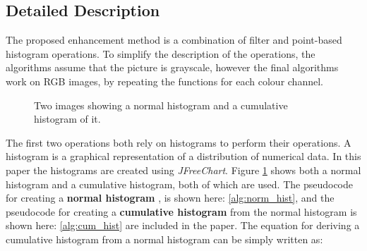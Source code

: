 \documentclass[journal,transmag]{IEEEtran}
\begin{document}
\subsection{Detailed Description}
The proposed enhancement method is a combination of filter and point-based histogram operations. To simplify the description of the operations, the algorithms assume that the picture is grayscale, however the final algorithms work on RGB images, by repeating the functions for each colour channel. 
\begin{figure}[h!] %
	\centering
	\caption{Two images showing a normal histogram and a cumulative histogram of it.}
	\label{fig:hist_comp}
\end{figure}
The first two operations both rely on histograms to perform their operations. A histogram is a graphical representation of a distribution of numerical data\cite{histDesc}\cite{histDescWiki}. In this paper the histograms are created using \textit{JFreeChart}\cite{jFreeChart}. Figure \ref{fig:hist_comp} shows both a normal histogram and a cumulative histogram, both of which are used. The pseudocode for creating a \textbf{normal histogram} , is shown here: \ref{alg:norm_hist}, and the pseudocode for creating a \textbf{cumulative histogram} from the normal histogram is shown here: \ref{alg:cum_hist} are included in the paper. The equation for deriving a cumulative histogram from a normal histogram can be simply written as: 
\end{document}
